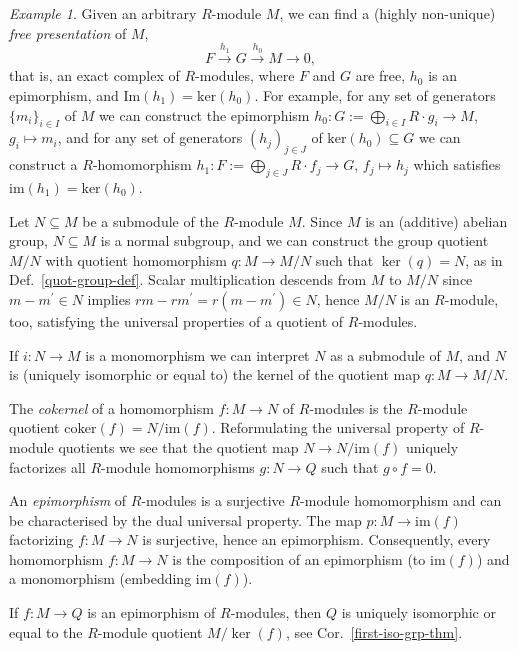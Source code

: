 \documentclass{amsart}
\theoremstyle{plain}
\numberwithin{equation}{section} %
\numberwithin{figure}{section} %
\theoremstyle{plain}
\theoremstyle{plain}
\theoremstyle{plain}
\theoremstyle{plain}
\theoremstyle{plain}
\theoremstyle{plain}
\theoremstyle{remark}
\theoremstyle{remark}
\theoremstyle{remark}
\newtheorem{exm}[thm]{Example}
\begin{document}
\begin{exm} \label{free-pres-exm}
Given an arbitrary $R$-module $M$, we can find a (highly non-unique) \textit{free presentation} of $M$, 
\[ F \stackrel{h_1}{\rightarrow} G \stackrel{h_0}{\rightarrow} M \rightarrow 0, \]
that is, an exact complex of $R$-modules, where $F$ and $G$ are free, $h_0$ is an epimorphism, and   
$\mathrm{Im}(h_1) = \mathrm{ker}(h_0)$. For example, for any set of generators $\{m_i\}_{i \in I}$ of $M$ we can construct the epimorphism $h_0 : G := \bigoplus_{i \in I} R \cdot g_i \rightarrow M$, $g_i \mapsto m_i$, and for any set of generators $(h_j)_{j \in J}$ of $\mathrm{ker}(h_0) \subseteq G$ we can construct a $R$-homomorphism $h_1 : F := \bigoplus_{j \in J} R \cdot f_j \rightarrow G$, $f_j \mapsto h_j$ which satisfies $\mathrm{im}(h_1) = \mathrm{ker}(h_0)$. 
\end{exm}

Let $N \subseteq M$ be a submodule of the $R$-module $M$. Since $M$ is an (additive) abelian group, $N \subseteq M$ is a normal subgroup, and we can construct the group quotient $M/N$ with quotient homomorphism $q: M \rightarrow M/N$ such that $\ker(q) = N$, as in Def.~\ref{quot-group-def}. Scalar multiplication descends from $M$ to $M/N$ since $m - m^\prime \in N$ implies $rm - rm^\prime = r(m - m^\prime) \in N$, hence $M/N$ is an $R$-module, too, satisfying the universal properties of a quotient of $R$-modules. 

If $i: N \rightarrow M$ is a monomorphism we can interpret $N$ as a submodule of $M$, and $N$ is (uniquely isomorphic or equal to) the kernel of the quotient map $q: M \rightarrow M/N$.

The \textit{cokernel} of a homomorphism $f: M \rightarrow N$ of $R$-modules is the $R$-module quotient $\mathrm{coker}(f) = N/\mathrm{im}(f)$. Reformulating the universal property of $R$-module quotients we see that the quotient map $N \rightarrow N/\mathrm{im}(f)$ uniquely factorizes all $R$-module homomorphisms $g : N \rightarrow Q$ such that $g \circ f = 0$.

 An \textit{epimorphism} of $R$-modules is a surjective $R$-module homomorphism and can be characterised by the dual universal property. The map $p: M \rightarrow \mathrm{im}(f)$ factorizing $f : M \rightarrow N$ is surjective, hence an epimorphism. Consequently, every homomorphism $f : M \rightarrow N$ is the composition of an epimorphism (to $\mathrm{im}(f)$) and a monomorphism (embedding $\mathrm{im}(f)$).

If $f: M \rightarrow Q$ is an epimorphism of $R$-modules, then $Q$ is uniquely isomorphic or equal to the $R$-module quotient $M/\ker(f)$, see Cor.~\ref{first-iso-grp-thm}.
\end{document}
